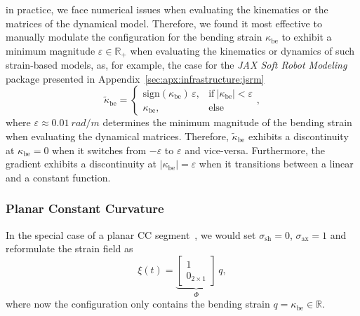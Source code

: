 in practice, we face numerical issues when evaluating the kinematics or the matrices of the dynamical model.
Therefore, we found it most effective to manually modulate the configuration for the bending strain $\kappa_\mathrm{be}$ to exhibit a minimum magnitude $\varepsilon \in \mathbb{R}_+$ when evaluating the kinematics or dynamics of such strain-based models, as, for example, the case for the \emph{JAX Soft Robot Modeling} package presented in Appendix~\ref{sec:apx:infrastructure:jsrm}
\begin{equation}
    \tilde{\kappa}_\mathrm{be} = \begin{cases}
        \mathrm{sign}(\kappa_\mathrm{be}) \, \varepsilon, & \text{if} \: |\kappa_\mathrm{be}| < \varepsilon\\
        \kappa_\mathrm{be}, & \text{else}
    \end{cases},
\end{equation}
where $\varepsilon \approx \SI{0.01}{rad \per m}$ determines the minimum magnitude of the bending strain when evaluating the dynamical matrices.
Therefore, $\tilde{\kappa}_\mathrm{be}$ exhibits a discontinuity at $\kappa_\mathrm{be} = 0$ when it switches from $-\varepsilon$ to $\varepsilon$ and vice-versa. Furthermore, the gradient exhibits a discontinuity at $|\kappa_\mathrm{be}| = \varepsilon$ when it transitions between a linear and a constant function.

\subsubsection{Planar Constant Curvature}
In the special case of a planar \gls{CC} segment~\citep{webster2010design, della2023model}, we would set $\sigma_\mathrm{sh} = 0$, $\sigma_\mathrm{ax} = 1$ and reformulate the strain field as 
\begin{equation}
    \xi(t) = \underbrace{\begin{bmatrix}
        1\\ 0_{2 \times 1}
    \end{bmatrix}}_{\Phi} \, q,
\end{equation}
where now the configuration only contains the bending strain $q = \kappa_\mathrm{be} \in \mathbb{R}$.


